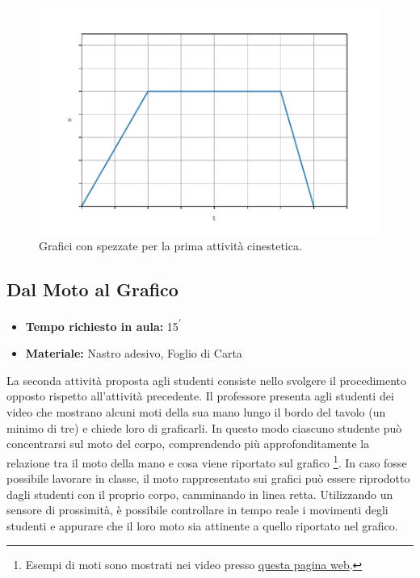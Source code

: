 \documentclass{report} \usepackage[T1]{fontenc} \usepackage[italian]{babel}
\begin{document}
\begin{figure}[H]
\centering
  \includegraphics[width=\textwidth]{kine_plot3}
  \caption{Grafici con spezzate per la prima attività
           cinestetica.}
  \label{fig:kine_plot3}
\end{figure}


\subsection{Dal Moto al Grafico}

\begin{itemize}
\item \textbf{Tempo richiesto in aula:} 15\textsuperscript{$\prime$}
\item \textbf{Materiale:} Nastro adesivo, Foglio di Carta
\end{itemize}

La seconda attività proposta agli studenti consiste nello svolgere il
procedimento opposto rispetto all’attività precedente. Il professore presenta
agli studenti dei video che mostrano  alcuni moti della sua mano lungo il bordo
del tavolo (un minimo di tre) e chiede loro di graficarli. In questo modo
ciascuno studente può concentrarsi sul moto del corpo, comprendendo più
approfonditamente la relazione tra il moto della mano e cosa viene riportato
sul grafico
\footnote{
          Esempi di moti sono mostrati nei video presso
          \textcolor{blue}{\href{https://github.com/savaroskij/PED1/tree/master/progetto_finale/media/video/kine_videos_2}{questa pagina web}}.
}.
In caso fosse possibile lavorare in classe, il moto rappresentato sui grafici
può essere riprodotto dagli studenti con il proprio corpo, camminando in linea
retta. Utilizzando un sensore di prossimità, è possibile controllare in
tempo reale i movimenti degli studenti e appurare che il loro moto sia
attinente a quello riportato nel grafico.
\end{document}
